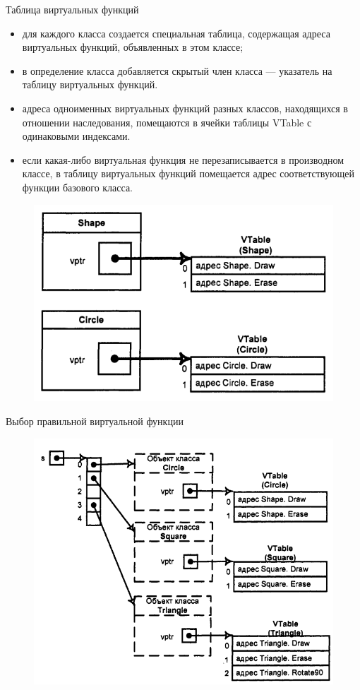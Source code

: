 \documentclass{beamer}
\begin{document}
\begin{frame}{Таблица виртуальных функций}
\begin{itemize}
\item для каждого класса создается специальная таблица, содержащая адреса виртуальных функций, объявленных в этом классе;
\item в определение класса добавляется скрытый член класса — указатель на таблицу виртуальных функций. 
\item адреса одноименных виртуальных функций разных классов, находящихся в отношении наследования, помещаются в ячейки таблицы VTable с одинаковыми индексами.
\item если какая-либо виртуальная функция не перезаписывается в производном классе, в таблицу виртуальных функций помещается адрес соответствующей функции базового класса.
\end{itemize}
\begin{figure}[h]
\centering
\includegraphics[scale=0.4]{images/lec07-pic10.png}
\end{figure}
\end{frame}

\begin{frame}{Выбор правильной виртуальной функции}
\begin{figure}[h]
\centering
\includegraphics[scale=0.4]{images/lec07-pic11.png}
\end{figure}
\end{frame}
\end{document}
